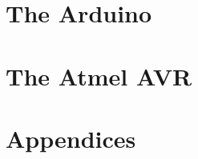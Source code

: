 \frontmatter






\mainmatter

\part{The Arduino}




\part{The Atmel AVR}




\backmatter

\part{Appendices}

